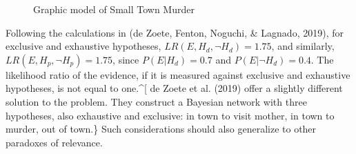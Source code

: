 \documentclass[10pt,dvipsnames,enabledeprecatedfontcommands]{scrartcl}
\begin{document}
\begin{figure}[!h]
    \begin{floatrow}
        {\caption{\footnotesize Graphic model of Small Town Murder}\label{fig:bayes_test4}}
    \end{floatrow}
\end{figure}

\noindent Following the calculations in (de Zoete, Fenton, Noguchi, \&
Lagnado, 2019), for exclusive and exhaustive hypotheses,
\(LR(E,H_d,\neg H_d)=1.75\), and similarly,
\(LR(E,H_p, \neg H_p)=1.75\), since \(P(E\vert H_d)=0.7\) and
\(P(E\vert \neg H_d)=0.4\). The likelihood ratio of the evidence, if it
is measured against exclusive and exhaustive hypotheses, is not equal to
one.\^{}{[} de Zoete et al. (2019) offer a slightly different solution
to the problem. They construct a Bayesian network with three hypotheses,
also exhaustive and exclusive: in town to visit mother, in town to
murder, out of town.\} Such considerations should also generalize to
other paradoxes of relevance.
\end{document}
